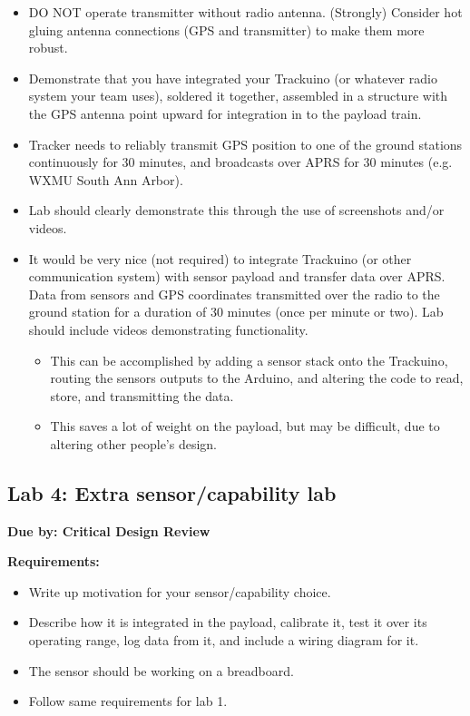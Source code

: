 \documentclass[11pt]{article}
\begin{document}
\begin{itemize}
    \item DO NOT operate transmitter without radio antenna. (Strongly)
      Consider hot gluing antenna connections (GPS and transmitter) to
      make them more robust.
    \item Demonstrate that you have integrated your Trackuino (or
      whatever radio system your team uses), soldered it together,
      assembled in a structure with the GPS antenna point upward for
      integration in to the payload train.
    \item Tracker needs to reliably transmit GPS position to one of
      the ground stations continuously for 30 minutes, and broadcasts
      over APRS for 30 minutes (e.g. WXMU South Ann Arbor).
    \item Lab should clearly demonstrate this through the use of
      screenshots and/or videos.
    \item It would be very nice (not required) to integrate Trackuino
      (or other communication system) with sensor payload and transfer
      data over APRS.  Data from sensors and GPS coordinates
      transmitted over the radio to the ground station for a duration
      of 30 minutes (once per minute or two). Lab should include
      videos demonstrating functionality.
      \begin{itemize}
        \item This can be accomplished by adding a sensor stack onto
          the Trackuino, routing the sensors outputs to the Arduino,
          and altering the code to read, store, and transmitting the
          data.
        \item This saves a lot of weight on the payload, but may be
          difficult, due to altering other people's design.
      \end{itemize}
\end{itemize}

\subsection{Lab 4: Extra sensor/capability lab}

{\bf Due by: Critical Design Review}

\noindent
{\bf Requirements:}

\begin{itemize}
   \item  Write up motivation for your sensor/capability choice.
   \item Describe how it is integrated in the payload, calibrate it,
     test it over its operating range, log data from it, and include a
     wiring diagram for it.
    \item The sensor should be working on a breadboard.
    \item Follow same requirements for lab 1.
\end{itemize}
\end{document}
